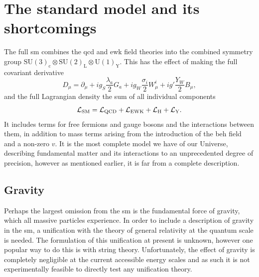 


\section{The standard model and its shortcomings} %
\label{sec:the_full_standard_model}
The full \acrshort{sm} combines the \acrshort{qcd} and \acrshort{ewk} field theories into the combined symmetry group $\mathrm{SU(3)_{c}}\otimes\mathrm{SU(2)_{L}}\otimes\mathrm{U(1)_{Y}}$.
This has the effect of making the full covariant derivative
\begin{equation}
	D_{\mu} = \partial_{\mu}+ig_{S}\frac{\lambda_{a}}{2}G_{a}+ig_{W}\frac{\sigma_{i}}{2}W_{\mu}^{i}+ig'\frac{Y_{W}}{2}B_{\mu},
\end{equation}
and the full Lagrangian density the sum of all individual components
\begin{equation}
	\mathcal{L}_{\mathrm{SM}} = \mathcal{L}_{\mathrm{QCD}} + \mathcal{L}_{\mathrm{EWK}} + \mathcal{L}_{\mathrm{H}} + \mathcal{L}_{\mathrm{Y}}.
\end{equation}
It includes terms for free fermions and gauge bosons and the interactions between them, in addition to mass terms arising from the introduction of the \acrshort{beh} field and a non-zero $v$.
It is the most complete model we have of our Universe, describing fundamental matter and its interactions to an unprecedented degree of precision, however as mentioned earlier, it is far from a complete description.

\subsection{Gravity} %
\label{sub:gravity}

Perhaps the largest omission from the \acrshort{sm} is the fundamental force of gravity, which all massive particles experience.
In order to include a description of gravity in the \acrshort{sm}, a unification with the theory of general relativity at the quantum scale is needed.
The formulation of this unification at present is unknown, however one popular way to do this is with string theory.
Unfortunately, the effect of gravity is completely negligible at the current accessible energy scales and as such it is not experimentally feasible to directly test any unification theory.  

